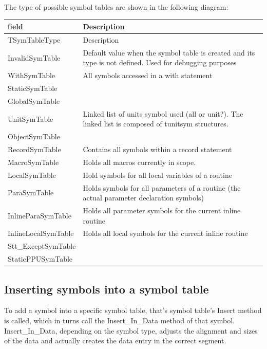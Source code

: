 \documentclass [a4paper,12pt]{article}
\begin{document}
The type of possible symbol tables are shown in the following diagram:

\begin{longtable}{|l|p{10cm}|}
\hline
field	& Description \\
\hline
\endhead
\hline
\endfoot
TSymTableType& Description \\
\textsf{InvalidSymTable}&
	Default value when the symbol table is created and its type is not defined. Used for debugging purposes \\
\textsf{WithSymTable}&
	All symbols accessed in a with statement \\
\textsf{StaticSymTable}&  \\
\textsf{GlobalSymTable}&  \\
\textsf{UnitSymTable}&
	Linked list of units symbol used (all or unit?). The linked list is
	composed of \textsf{tunitsym} structures. \\
\textsf{ObjectSymTable}&  \\
\textsf{RecordSymTable}&
	Contains all symbols within a record statement \\
\textsf{MacroSymTable}&
	Holds all macros currently in scope. \\
\textsf{LocalSymTable}&
	Hold symbols for all local variables of a routine \\
\textsf{ParaSymTable}&
	Holds symbols for all parameters of a routine (the actual parameter declaration symbols) \\
\textsf{InlineParaSymTable}&
	Holds all parameter symbols for the current inline routine \\
\textsf{InlineLocalSymTable}&
	Holds all local symbols for the current inline routine \\
\textsf{Stt{\_}ExceptSymTable}&  \\
\textsf{StaticPPUSymTable}& 
\label{tab36}
\end{longtable}

\subsection{Inserting symbols into a symbol table}
\label{subsec:inserting}

To add a symbol into a specific symbol table, that's symbol table's
\textsf{Insert} method is called, which in turns call the
\textsf{Insert{\_}In{\_}Data} method of that symbol.
\textsf{Insert{\_}In{\_}Data}, depending on the symbol type, adjusts the
alignment and sizes of the data and actually creates the data entry in the
correct segment.
\end{document}
